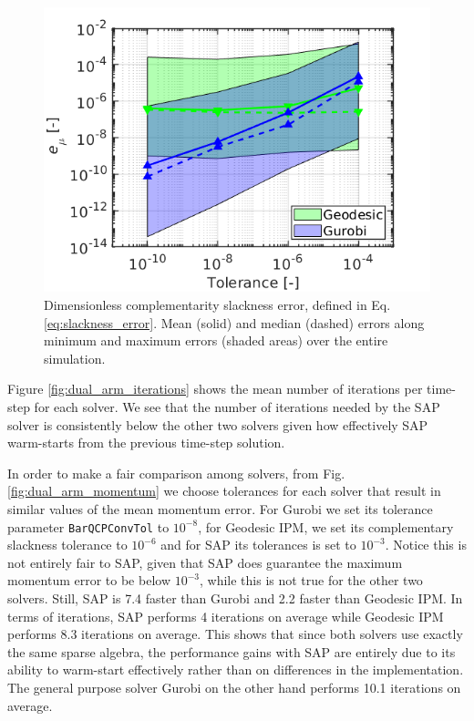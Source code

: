 \begin{figure}[!h]
	\centering
    \includegraphics[width=0.7\columnwidth]{figures/dual_arm/optimality_condition.png}
    \caption{\label{fig:dual_arm_slackness} Dimensionless complementarity
    slackness error, defined in Eq. \eqref{eq:slackness_error}. Mean (solid) and
    median (dashed) errors along minimum and maximum errors (shaded areas) over
    the entire simulation.}
\end{figure}

Figure \ref{fig:dual_arm_iterations} shows the mean number of iterations per
time-step for each solver. We see that the number of iterations needed by the
SAP solver is consistently below the other two solvers given how effectively SAP
warm-starts from the previous time-step solution.

In order to make a fair comparison among solvers, from Fig.
\ref{fig:dual_arm_momentum} we choose tolerances for each solver that result in
similar values of the mean momentum error. For Gurobi we set its tolerance
parameter \verb+BarQCPConvTol+ to $10^{-8}$, for Geodesic IPM, we set its
complementary slackness tolerance to $10^{-6}$ and for SAP its tolerances is set
to $10^{-3}$. Notice this is not entirely fair to SAP, given that SAP does
guarantee the maximum momentum error to be below $10^{-3}$, while this is not
true for the other two solvers. Still, SAP is 7.4 faster than Gurobi and 2.2
faster than Geodesic IPM. In terms of iterations, SAP performs 4 iterations on
average while Geodesic IPM performs 8.3 iterations on average. This shows that
since both solvers use exactly the same sparse algebra, the performance gains
with SAP are entirely due to its ability to warm-start effectively rather than
on differences in the implementation. The general purpose solver Gurobi on the
other hand performs 10.1 iterations on average.

